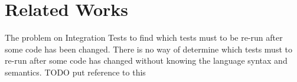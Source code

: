 




    \section{Related Works}

    The problem on Integration Tests to find which tests must to be re\hyp{}run
    after some code has been changed. There is no way of determine which
    tests must to re\hyp{}run after some code has changed without knowing the
    language syntax and semantics. TODO put reference to this



